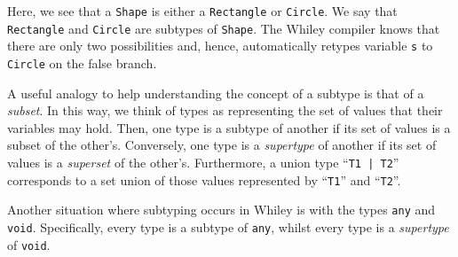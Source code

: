 Here, we see that a \lstinline{Shape} is either a \lstinline{Rectangle} or \lstinline{Circle}.  We say that \lstinline{Rectangle} and \lstinline{Circle} are subtypes of \lstinline{Shape}.  The Whiley compiler knows that there are only two possibilities and, hence, automatically retypes variable \lstinline{s} to \lstinline{Circle} on the false branch.

\begin{insight}
A useful analogy to help understanding the concept of a subtype is that of a {\em subset}.  In this way, we think of types as representing the set of values that their variables may hold.  Then, one type is a subtype of another if its set of values is a subset of the other's.  Conversely, one type is a {\em supertype} of another if its set of values is a {\em superset} of the other's.  Furthermore, a union type ``\lstinline{T1 | T2}'' corresponds to a set union of those values represented by ``\lstinline{T1}'' and ``\lstinline{T2}''.
\end{insight}

Another situation where subtyping occurs in Whiley is with the types \lstinline{any} and \lstinline{void}.  Specifically, every type is a subtype of \lstinline{any}, whilst every type is a {\em supertype} of \lstinline{void}.  